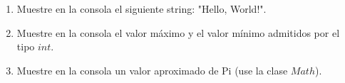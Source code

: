 \begin{enumerate}
	\item Muestre en la consola el siguiente string: "Hello, World!".
	\item Muestre en la consola el valor máximo y el valor mínimo admitidos por el tipo $int$.
	\item Muestre en la consola un valor aproximado de Pi (use la clase $Math$).
\end{enumerate}